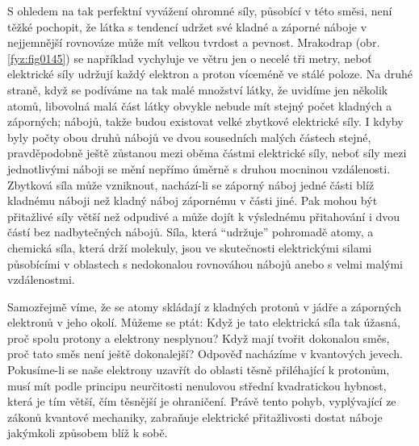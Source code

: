     S ohledem na tak perfektní vyvážení ohromné síly, působící v této směsi, není těžké pochopit, že
    látka s tendencí udržet své kladné a záporné náboje v nejjemnější rovnováze může mít velkou
    tvrdost a pevnost. Mrakodrap \wikiELB (obr. \ref{fyz:fig0145}) se například vychyluje ve větru
    jen o necelé tři metry, neboť elektrické síly udržují každý elektron a proton víceméně ve stálé
    poloze. Na druhé straně, když se podíváme na tak malé množství látky, že uvidíme jen několik
    atomů, libovolná malá část látky obvykle nebude mít stejný počet kladných a záporných; nábojů,
    takže budou existovat velké zbytkové elektrické síly. I kdyby byly počty obou druhů nábojů ve
    dvou sousedních malých částech stejné, pravděpodobně ještě zůstanou mezi oběma částmi elektrické
    síly, neboť síly mezi jednotlivými náboji se mění nepřímo úměrně s druhou mocninou vzdálenosti.
    Zbytková síla může vzniknout, nachází-li se záporný náboj jedné části blíž kladnému náboji než
    kladný náboj zápornému v části jiné. Pak mohou být přitažlivé síly větší než odpudivé a může
    dojít k výslednému přitahování i dvou částí bez nadbytečných nábojů. Síla, která “udržuje”
    pohromadě atomy, a chemická síla, která drží molekuly, jsou ve skutečnosti elektrickými silami
    působícími v oblastech s nedokonalou rovnováhou nábojů anebo s velmi malými vzdálenostmi.

    Samozřejmě víme, že se atomy skládají z kladných protonů v jádře a záporných elektronů v jeho 
    okolí. Můžeme se ptát: Když je tato elektrická síla tak úžasná, proč spolu protony a elektrony 
    nesplynou? Když mají tvořit dokonalou směs, proč tato směs není ještě dokonalejší? Odpověď 
    nacházíme v kvantových jevech. Pokusíme-li se naše elektrony uzavřít do oblasti těsně 
    přiléhající k protonům, musí mít podle principu neurčitosti nenulovou střední kvadratickou 
    hybnost, která je tím větší, čím těsnější je ohraničení. Právě tento pohyb, vyplývající ze 
    zákonů kvantové mechaniky, zabraňuje elektrické přitažlivosti dostat náboje jakýmkoli způsobem 
    blíž k sobě.
    

